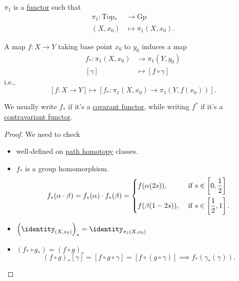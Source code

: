 \begin{theorem}
	\(\pi _1\) is a \hyperref[def:functor]{functor} such that
	\[
		\begin{split}
			\pi _1\colon \underline{\mathrm{Top}_*} &\to \underline{\mathrm{Gp}}\\
			(X, x_0)&\mapsto \pi _1(X, x_0).
		\end{split}
	\]

	A map \(f\colon X\to Y\) taking base point \(x_0\) to \(y_0\) induces a map
	\[
		\begin{split}
			f_*\colon \pi _1(X, x_0)&\to \pi _1(Y, y_0)\\
			[\gamma]&\mapsto [f\circ \gamma]
		\end{split}
	\]
	i.e.,
	\[
		\left[f\colon X\to Y\right] \mapsto \left[f_*\colon \pi _1(X, x_0)\to \pi _1(Y, f(x_0))\right].
	\]
\end{theorem}
\begin{notation}
	We usually write \(f_*\) if it's a \hyperref[def:functor]{covarant functor}, while writing \(f^*\)
	if it's a \hyperref[def:contravariant-functor]{contravariant functor}.
\end{notation}
\begin{proof}
	We need to check
	\begin{itemize}
		\item well-defined on \hyperref[def:homotopy-path]{path homotopy} classes.
		\item \(f_\ast\) is a group homomorphism.
		      \[
			      f_\ast(\alpha \cdot \beta ) = f_\ast(\alpha )\cdot f_\ast(\beta ) = \begin{dcases}
				      f(\alpha (2s)),  & \text{ if }  s\in \left[0, \frac{1}{2}\right]  \\
				      f(\beta (1-2s)), & \text{ if }  s\in \left[\frac{1}{2}, 1\right].
			      \end{dcases}
		      \]
		\item \(\left(\identity_{(X, x_0)} \right)_\ast = \identity_{\pi _1(X, x_0)} \)
		\item \((f_\ast\circ g_\ast) = (f\circ g)_\ast\)
		      \[
			      (f\circ g)_\ast[\gamma] = [f\circ g\circ \gamma] = [f\circ (g\circ \gamma)]\implies f_\ast(\gamma_\ast(\gamma)).
		      \]
	\end{itemize}
\end{proof}